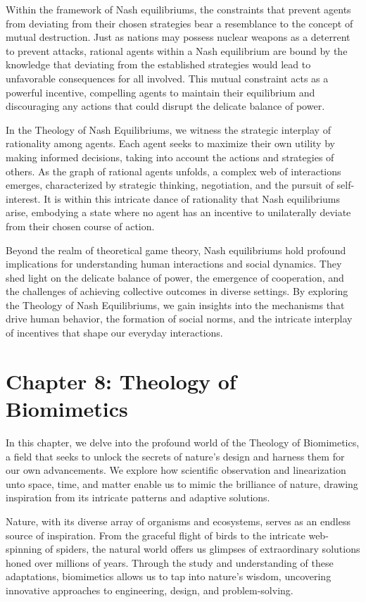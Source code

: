 \documentclass[ebook,12pt,oneside,openany]{memoir}
\begin{document}
\indent Within the framework of Nash equilibriums, the constraints that prevent agents from deviating from their chosen strategies bear a resemblance to the concept of mutual destruction. Just as nations may possess nuclear weapons as a deterrent to prevent attacks, rational agents within a Nash equilibrium are bound by the knowledge that deviating from the established strategies would lead to unfavorable consequences for all involved. This mutual constraint acts as a powerful incentive, compelling agents to maintain their equilibrium and discouraging any actions that could disrupt the delicate balance of power.

\indent In the Theology of Nash Equilibriums, we witness the strategic interplay of rationality among agents. Each agent seeks to maximize their own utility by making informed decisions, taking into account the actions and strategies of others. As the graph of rational agents unfolds, a complex web of interactions emerges, characterized by strategic thinking, negotiation, and the pursuit of self-interest. It is within this intricate dance of rationality that Nash equilibriums arise, embodying a state where no agent has an incentive to unilaterally deviate from their chosen course of action.

\indent Beyond the realm of theoretical game theory, Nash equilibriums hold profound implications for understanding human interactions and social dynamics. They shed light on the delicate balance of power, the emergence of cooperation, and the challenges of achieving collective outcomes in diverse settings. By exploring the Theology of Nash Equilibriums, we gain insights into the mechanisms that drive human behavior, the formation of social norms, and the intricate interplay of incentives that shape our everyday interactions.
\chapter*{Chapter 8: Theology of Biomimetics}


\indent \indent In this chapter, we delve into the profound world of the Theology of Biomimetics, a field that seeks to unlock the secrets of nature's design and harness them for our own advancements. We explore how scientific observation and linearization unto space, time, and matter enable us to mimic the brilliance of nature, drawing inspiration from its intricate patterns and adaptive solutions.

\indent Nature, with its diverse array of organisms and ecosystems, serves as an endless source of inspiration. From the graceful flight of birds to the intricate web-spinning of spiders, the natural world offers us glimpses of extraordinary solutions honed over millions of years. Through the study and understanding of these adaptations, biomimetics allows us to tap into nature's wisdom, uncovering innovative approaches to engineering, design, and problem-solving.
\end{document}
